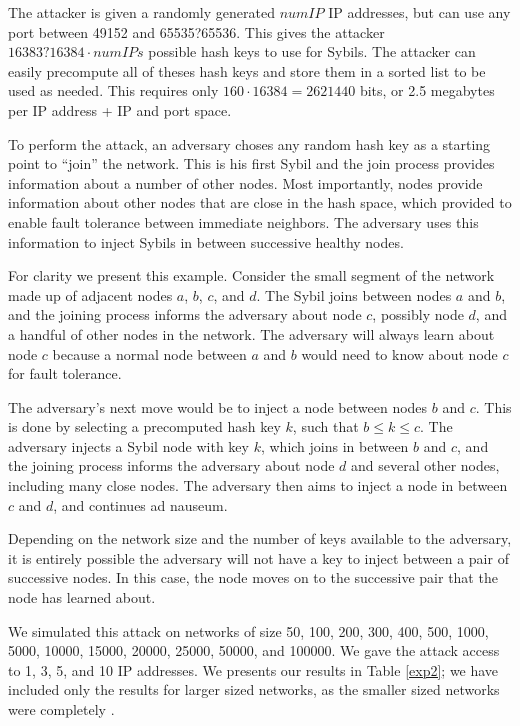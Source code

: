 \documentclass[a4paper]{article}
\begin{document}
The attacker is given a randomly generated $numIP$ IP addresses, but can use any port between 49152 and 65535?65536.
This gives the attacker $ 16383?16384 \cdot numIPs $ possible hash keys to use for Sybils.
The attacker can easily precompute all of theses hash keys and store them in a sorted list to be used as needed.
This requires only $160 \cdot 16384 = 2621440$  bits, or 2.5 megabytes per IP address + IP and port space.

To perform the attack, an adversary choses any random hash key as a starting point to ``join'' the network.
This is his first Sybil and the join process provides information about a number of other nodes.
Most importantly,  nodes provide information about other nodes that are close in the hash space, which provided to enable fault tolerance between immediate neighbors.
The adversary uses this information to inject Sybils in between successive healthy nodes.


For clarity we present this example. 
Consider the small segment of the network made up of adjacent nodes $a$, $b$, $c$, and $d$.
The Sybil joins between nodes $a$ and $b$, and the joining process informs the adversary about node $c$, possibly node $d$, and a handful of other nodes in the network.
The adversary will always learn about node $c$ because a normal node between $a$ and $b$ would need to know about node $c$ for fault tolerance.

The adversary's next move would be to inject a node between nodes $b$ and $c$.
This is done by selecting a precomputed hash key $k$, such that $b \leq k \leq c$.
The adversary injects a Sybil node with key $k$, which joins in between $b$ and $c$, and the joining process informs the adversary about node $d$ and several other nodes, including many close nodes.
The adversary then aims to inject a node in between $c$ and $d$, and continues ad nauseum.

Depending on the network size and the number of keys available to the adversary, it is entirely possible the adversary will not have a key to inject between a pair of successive nodes.
In this case, the node moves on to the successive pair that the node has learned about.


We simulated this attack on networks of size 50, 100, 200, 300, 400, 500, 1000, 5000, 10000, 15000, 20000, 25000, 50000, and 100000.
We gave the attack access to 1, 3, 5, and 10 IP addresses.
We presents our results in Table \ref{exp2}; we have included only the results for larger sized networks, as the smaller sized networks were completely .
\end{document}
